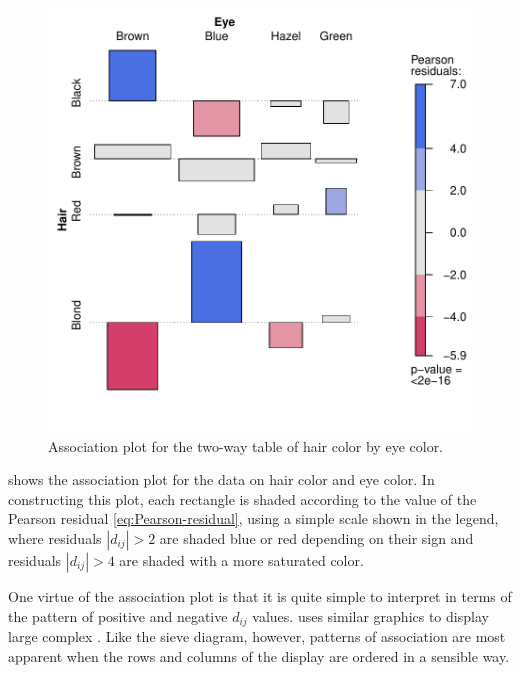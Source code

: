 \documentclass[11pt]{book}
\renewenvironment{knitrout}{\small\renewcommand{\baselinestretch}{.85}}{} %
\begin{document}
\begin{knitrout}
\color{fgcolor}\begin{kframe}
\begin{alltt}
 \hlkwb{<-}  \hlopt{:}\hlstd{)}
 \hlstd{=}\hlstd{)}
\end{alltt}
\end{kframe}\begin{figure}[!htbp]


\centerline{\includegraphics[width=.6\textwidth]{ch04/fig/HE-assoc} }

\caption[Association plot for the two-way table of hair color by eye color]{Association plot for the two-way table of hair color by eye color.\label{fig:HE-assoc}}
\end{figure}


\end{knitrout}
 shows the association plot for the data on
hair color and eye color.
In constructing this plot, each rectangle is shaded according to
the value of the Pearson residual \eqref{eq:Pearson-residual},
using a simple scale shown in the legend, where residuals
$|d_{ij}| > 2$ are shaded blue or red depending on their sign
and residuals $|d_{ij}| > 4$
are shaded with a more saturated color.

One virtue of the association plot is that it is quite simple to
interpret in terms of the pattern of
positive and negative  $d_{ij}$ values.
\citet{Bertin:81} uses similar graphics to display large complex
\ctabs.  Like the sieve diagram, however, patterns of association
are most apparent when the rows and columns of the display are ordered
in a sensible way.
\end{document}
